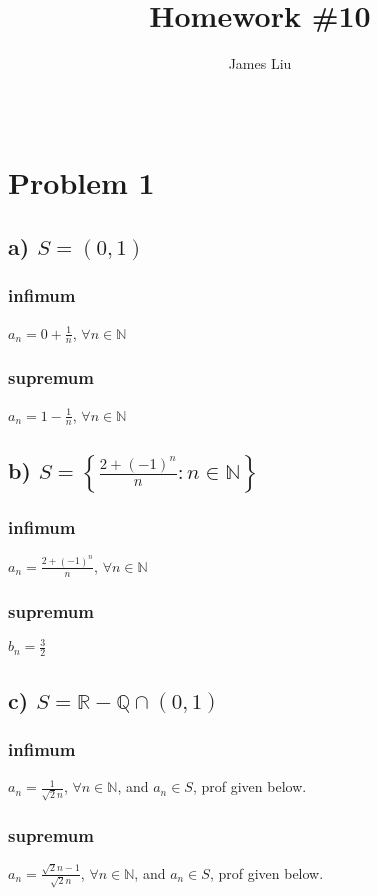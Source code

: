 \documentclass{article}
\title{\textbf{Homework \#10 }}
\author{James Liu}
\date{\ }
\begin{document}
\maketitle

\section*{Problem 1}
\subsection*{a) \(S = (0,1)\)}
\subsubsection*{infimum}
\(a_n = 0+\frac{1}{n}\), \(\forall n \in \mathbb{N}\)
\subsubsection*{supremum}
\(a_n = 1 - \frac{1}{n}\), \(\forall n \in \mathbb{N}\)
\subsection*{b) \(S = \left\{\frac{2+(-1)^n}{n}:n\in\mathbb{N}\right\}\)}
\subsubsection*{infimum}
\(a_n = \frac{2+(-1)^n}{n}\), \(\forall n\in\mathbb{N}\)
\subsubsection*{supremum}
\(b_n = \frac{3}{2}\)
\subsection*{c) \(S =\mathbb{R}-\mathbb{Q}\cap (0,1)\)}
\subsubsection*{infimum}
\(a_n = \frac{1}{\sqrt 2 n}\), \(\forall n \in \mathbb{N}\), and \(a_n\in S\), prof given below.
\subsubsection*{supremum}
\(a_n = \frac{\sqrt 2 n -1}{\sqrt 2 n}\), \(\forall n \in \mathbb{N}\), and \(a_n\in S\), prof given below.
\end{document}
